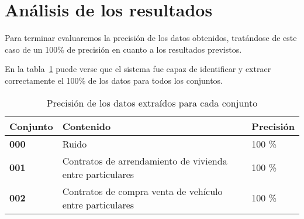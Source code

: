 \section{Análisis de los resultados}

Para terminar evaluaremos la precisión de los datos obtenidos, tratándose de este caso de un 100\%
de precisión en cuanto a los resultados previstos.

En la tabla~\ref{tab:data_set_performance} puede verse que el sistema fue capaz de identificar y extraer
correctamente el 100\% de los datos para todos los conjuntos.

\begin{table}[h]
    \renewcommand{\arraystretch}{1.5}
    \setlength{\tabcolsep}{10pt}
    \begin{tabular}{>{\bfseries}p{} p{} p{}}
        \toprule
        \textbf{Conjunto} & \textbf{Contenido}                                        & \textbf{Precisión} \\
        \midrule
        \textbf{000}      & Ruido                                                     & 100 \%             \\
        \textbf{001}      & Contratos de arrendamiento de vivienda entre particulares & 100 \%             \\
        \textbf{002}      & Contratos de compra venta de vehículo entre particulares  & 100 \%             \\
        \bottomrule
    \end{tabular}
    \caption{Precisión de los datos extraídos para cada conjunto}
    \label{tab:data_set_performance}
\end{table}